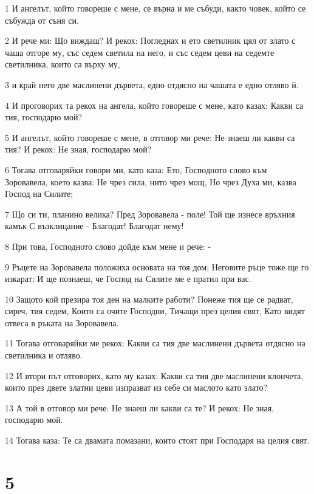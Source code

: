 \par 1 И ангелът, който говореше с мене, се върна и ме събуди, както човек, който се събужда от съня си.
\par 2 И рече ми: Що виждаш? И рекох: Погледнах и ето светилник цял от злато с чаша отгоре му, със седем светила на него, и със седем цеви на седемте светилника, които са върху му,
\par 3 и край него две маслинени дървета, едно отдясно на чашата е едно отляво й.
\par 4 И проговорих та рекох на ангела, който говореше с мене, като казах: Какви са тия, господарю мой?
\par 5 И ангелът, който говореше с мене, в отговор ми рече: Не знаеш ли какви са тия? И рекох: Не зная, господарю мой?
\par 6 Тогава отговаряйки говори ми, като каза: Ето, Господното слово към Зоровавела, което казва: Не чрез сила, нито чрез мощ, Но чрез Духа ми, казва Господ на Силите;
\par 7 Що си ти, планино велика? Пред Зоровавела - поле! Той ще изнесе връхния камък С възклицание - Благодат! Благодат нему!
\par 8 При това, Господното слово дойде към мене и рече: -
\par 9 Ръцете на Зоровавела положиха основата на тоя дом; Неговите ръце тоже ще го изкарат; И ще познаеш, че Господ на Силите ме е пратил при вас.
\par 10 Защото кой презира тоя ден на малките работи? Понеже тия ще се радват, сиреч, тия седем, Които са очите Господни, Тичащи през целия свят, Като видят отвеса в ръката на Зоровавела.
\par 11 Тогава отговаряйки ме рекох: Какви са тия две маслинени дървета отдясно на светилника и отляво.
\par 12 И втори път отговорих, като му казах: Какви са тия две маслинени клончета, които през двете златни цеви изпразват из себе си маслото като злато?
\par 13 А той в отговор ми рече: Не знаеш ли какви са те? И рекох: Не зная, господарю мой.
\par 14 Тогава каза: Те са двамата помазани, които стоят при Господаря на целия свят.

\chapter{5}

